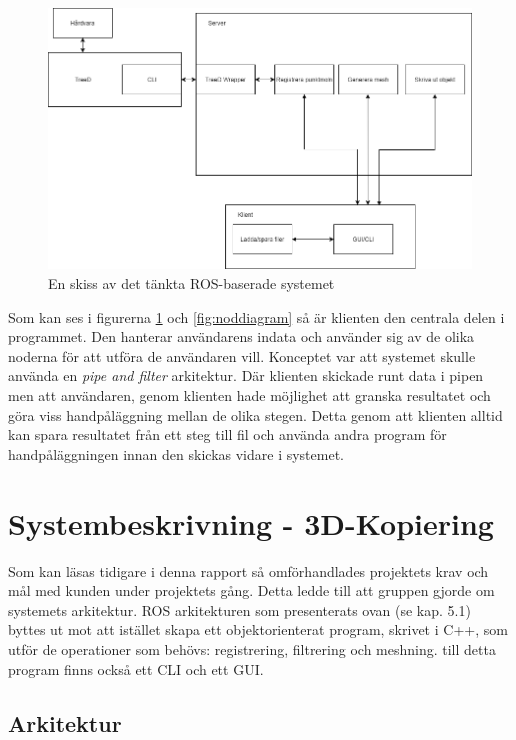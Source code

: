 \begin{figure}[H]
	\centering
	\includegraphics[width=130mm]{figures/Systemskiss_gamla.png}
	\caption{En skiss av det tänkta ROS-baserade systemet}
	\label{fig:systembeskrivning_gamla}
\end{figure}

Som kan ses i figurerna \ref{fig:systembeskrivning_gamla} och \ref{fig:noddiagram} så är klienten den centrala delen i programmet. Den hanterar användarens indata och använder sig av de olika noderna för att utföra de användaren vill. Konceptet var att systemet skulle använda en \textit{pipe and filter} arkitektur. Där klienten skickade runt data i pipen men att användaren, genom klienten hade möjlighet att granska resultatet och göra viss handpåläggning mellan de olika stegen. Detta genom att klienten alltid kan spara resultatet från ett steg till fil och använda andra program för handpåläggningen innan den skickas vidare i systemet.

\section{Systembeskrivning - 3D-Kopiering}

Som kan läsas tidigare i denna rapport så omförhandlades projektets krav och mål med kunden under projektets gång. Detta ledde till att gruppen gjorde om systemets arkitektur. ROS arkitekturen som presenterats ovan (se kap. 5.1) byttes ut mot att istället skapa ett objektorienterat program, skrivet i C++, som utför de operationer som behövs: registrering, filtrering och meshning. till detta program finns också ett CLI och ett GUI.

\subsection{Arkitektur}

